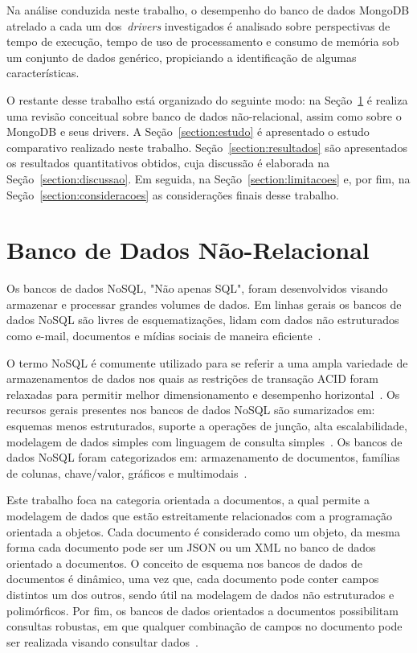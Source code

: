 \documentclass[12pt]{article}
\begin{document}
Na análise conduzida neste trabalho, o desempenho do banco de dados MongoDB atrelado a cada um dos~\emph{drivers} investigados é analisado sobre perspectivas de tempo de execução, tempo de uso de processamento e consumo de memória sob um conjunto de dados genérico, propiciando a identificação de algumas características.

O restante desse trabalho está organizado do seguinte modo: na Seção~\ref{section:nao-relacional} é realiza uma revisão conceitual sobre banco de dados não-relacional, assim como sobre o MongoDB e seus drivers. A Seção~\ref{section:estudo} é apresentado o estudo comparativo realizado neste trabalho. Seção~\ref{section:resultados} são apresentados os resultados quantitativos obtidos, cuja discussão é elaborada na Seção~\ref{section:discussao}. Em seguida, na Seção~\ref{section:limitacoes} e, por fim, na Seção~\ref{section:consideracoes} as considerações finais desse trabalho.


\section{Banco de Dados Não-Relacional}
\label{section:nao-relacional}

Os bancos de dados NoSQL, "Não apenas SQL", foram desenvolvidos visando armazenar e processar grandes volumes de dados. Em linhas gerais os bancos de dados NoSQL são livres de esquematizações, lidam com dados não estruturados como e-mail, documentos e mídias sociais de maneira eficiente~\cite{mohamed:2014,ramesh:2016}.

O termo NoSQL é comumente utilizado para se referir a uma ampla variedade de armazenamentos de dados nos quais as restrições de transação ACID foram relaxadas para permitir melhor dimensionamento e desempenho horizontal~\cite{rafique:2018}. Os recursos gerais presentes nos bancos de dados NoSQL são sumarizados em: esquemas menos estruturados, suporte a operações de junção, alta escalabilidade, modelagem de dados simples com linguagem de consulta simples~\cite{ramesh:2016}. Os bancos de dados NoSQL foram categorizados em: armazenamento de documentos, famílias de colunas, chave/valor, gráficos e multimodais~\cite{aparicio:2016}.

Este trabalho foca na categoria orientada a documentos, a qual permite a modelagem de dados que estão estreitamente relacionados com a programação orientada a objetos. 
Cada documento é considerado como um objeto, da mesma forma cada documento pode ser um JSON ou um XML no banco de dados orientado a documentos. 
O conceito de esquema nos bancos de dados de documentos é dinâmico, uma vez que, cada documento pode conter campos distintos um dos outros, sendo útil na modelagem de dados não estruturados e polimórficos. 
Por fim, os bancos de dados orientados a documentos possibilitam consultas robustas, em que qualquer combinação de campos no documento pode ser realizada visando consultar dados~\cite{patil:2017}.
\end{document}
